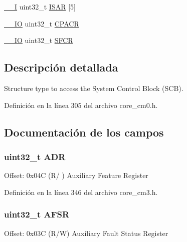 \begin{DoxyCompactItemize}
\item 
\hyperlink{core__sc300_8h_af63697ed9952cc71e1225efe205f6cd3}{\+\_\+\+\_\+I} uint32\+\_\+t \hyperlink{struct_s_c_b___type_abdeaebf965a4ca1dfde816cab85f1156}{I\+S\+AR} \mbox{[}5\mbox{]}
\item 
\hyperlink{core__sc300_8h_aec43007d9998a0a0e01faede4133d6be}{\+\_\+\+\_\+\+IO} uint32\+\_\+t \hyperlink{struct_s_c_b___type_acccaf5688449c8253e9952ddc2161528}{C\+P\+A\+CR}
\item 
\hyperlink{core__sc300_8h_aec43007d9998a0a0e01faede4133d6be}{\+\_\+\+\_\+\+IO} uint32\+\_\+t \hyperlink{struct_s_c_b___type_aa71bce1c6b3b85a1625a4bf040db7234}{S\+F\+CR}
\end{DoxyCompactItemize}


\subsection{Descripción detallada}
Structure type to access the System Control Block (S\+CB). 

Definición en la línea 305 del archivo core\+\_\+cm0.\+h.



\subsection{Documentación de los campos}
\subsubsection[{\texorpdfstring{A\+DR}{ADR}}]{ uint32\+\_\+t A\+DR}\hypertarget{struct_s_c_b___type_a5c0e2e1c7195d4dc09a5ca077c596318}{}\label{struct_s_c_b___type_a5c0e2e1c7195d4dc09a5ca077c596318}
Offset\+: 0x04C (R/ ) Auxiliary Feature Register 

Definición en la línea 346 del archivo core\+\_\+cm3.\+h.

\subsubsection[{\texorpdfstring{A\+F\+SR}{AFSR}}]{ uint32\+\_\+t A\+F\+SR}\hypertarget{struct_s_c_b___type_ab9176079ea223dd8902589da91af63a2}{}\label{struct_s_c_b___type_ab9176079ea223dd8902589da91af63a2}
Offset\+: 0x03C (R/W) Auxiliary Fault Status Register 

